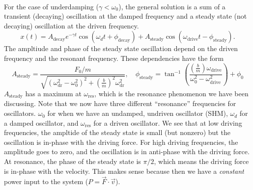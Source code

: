 \documentclass[../classical_mechanics.tex]{subfiles}
\begin{document}
        \paragraph{}
        For the case of underdamping ($\gamma<\omega_0$), the general solution is a sum of a transient (decaying) oscillation at the damped frequency and a steady state (not decaying) oscillation at the driven frequency.
        \begin{equation}
            x(t)=A_\text{decay}e^{-\gamma t}\cos(\omega_d t+\phi_\text{decay})+A_\text{steady}\cos(\omega_\text{drive}t-\phi_\text{steady}).
        \end{equation}
        The ampltiude and phase of the steady state oscillation depend on the driven frequency and the resonant frequency.
        These dependencies have the form
        \begin{equation}
            A_\text{steady}=\frac{F_0/m}{\sqrt{(\omega_\text{dr}^2-\omega_0^2)^2+\left(\frac{b}{m}\right)^2\omega_\text{dr}^2}},\quad\phi_\text{steady}=\tan^{-1}\left(\frac{\left(\frac{b}{m}\right)\omega_\text{drive}}{\omega_0^2-\omega_\text{drive}^2}\right)+\phi_0
        \end{equation}
        $A_\text{steady}$ has a maximum at $\omega_\text{res}$, which is the resonance phenomenon we have been discussing.
        Note that we now have three different ``resonance'' frequencies for oscillators.
        $\omega_0$ for when we have an undamped, undriven oscillator (SHM), $\omega_d$ for a damped oscillator, and $\omega_\text{res}$ for a driven oscillator.
        We see that at low driving frequencies, the ampltide of the steady state is small (but nonzero) but the oscillation is in-phase with the driving force.
        For high driving frequencies, the amplitude goes to zero, and the oscillation is in anti-phase with the driving force.
        At resonance, the phase of the steady state is $\pi/2$, which means the driving force is in-phase with the velocity.
        This makes sense because then we have a \textit{constant} power input to the system ($P=\vec{F}\cdot\vec{v}$).
\end{document}

